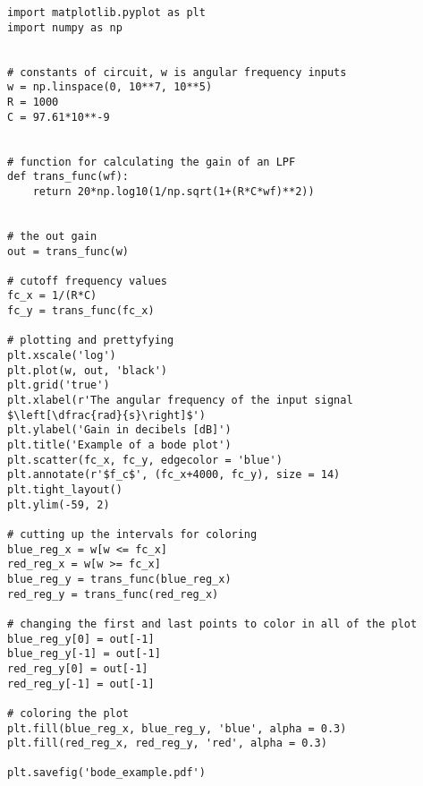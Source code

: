 \begin{lstlisting}[breaklines]
import matplotlib.pyplot as plt
import numpy as np


# constants of circuit, w is angular frequency inputs
w = np.linspace(0, 10**7, 10**5)
R = 1000
C = 97.61*10**-9


# function for calculating the gain of an LPF
def trans_func(wf):
    return 20*np.log10(1/np.sqrt(1+(R*C*wf)**2))


# the out gain
out = trans_func(w)

# cutoff frequency values
fc_x = 1/(R*C)
fc_y = trans_func(fc_x)

# plotting and prettyfying
plt.xscale('log')
plt.plot(w, out, 'black')
plt.grid('true')
plt.xlabel(r'The angular frequency of the input signal $\left[\dfrac{rad}{s}\right]$')
plt.ylabel('Gain in decibels [dB]')
plt.title('Example of a bode plot')
plt.scatter(fc_x, fc_y, edgecolor = 'blue')
plt.annotate(r'$f_c$', (fc_x+4000, fc_y), size = 14)
plt.tight_layout()
plt.ylim(-59, 2)

# cutting up the intervals for coloring
blue_reg_x = w[w <= fc_x]
red_reg_x = w[w >= fc_x]
blue_reg_y = trans_func(blue_reg_x)
red_reg_y = trans_func(red_reg_x)

# changing the first and last points to color in all of the plot
blue_reg_y[0] = out[-1]
blue_reg_y[-1] = out[-1]
red_reg_y[0] = out[-1]
red_reg_y[-1] = out[-1]

# coloring the plot
plt.fill(blue_reg_x, blue_reg_y, 'blue', alpha = 0.3)
plt.fill(red_reg_x, red_reg_y, 'red', alpha = 0.3)

plt.savefig('bode_example.pdf')

\end{lstlisting}
